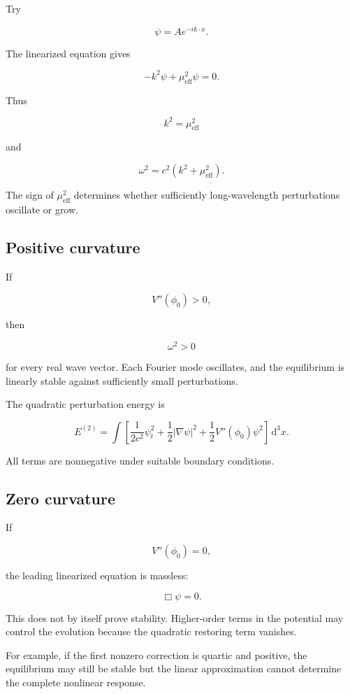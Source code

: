 Try

\[
\psi
=
A e^{-ik\cdot x}.
\]

The linearized equation gives

\[
-k^{2}\psi
+
\mu_{\mathrm{eff}}^{2}\psi
=0.
\]

Thus

\[
\boxed{
k^{2}=\mu_{\mathrm{eff}}^{2}
}
\]

and

\[
\boxed{
\omega^{2}
=
c^{2}
\left(
k^{2}+\mu_{\mathrm{eff}}^{2}
\right)
}.
\]

The sign of \(\mu_{\mathrm{eff}}^{2}\) determines whether sufficiently long-wavelength perturbations oscillate or grow.

\subsection{Positive curvature}

If

\[
V''(\phi_{0})>0,
\]

then

\[
\omega^{2}>0
\]

for every real wave vector. Each Fourier mode oscillates, and the equilibrium is linearly stable against sufficiently small perturbations.

The quadratic perturbation energy is

\[
\boxed{
E^{(2)}
=
\int
\left[
\frac{1}{2c^{2}}\psi_{t}^{2}
+
\frac{1}{2}|\nabla\psi|^{2}
+
\frac{1}{2}
V''(\phi_{0})\psi^{2}
\right]
\,\mathrm{d}^{3}x
}.
\]

All terms are nonnegative under suitable boundary conditions.

\subsection{Zero curvature}

If

\[
V''(\phi_{0})=0,
\]

the leading linearized equation is massless:

\[
\Box\psi=0.
\]

This does not by itself prove stability. Higher-order terms in the potential may control the evolution because the quadratic restoring term vanishes.

For example, if the first nonzero correction is quartic and positive, the equilibrium may still be stable but the linear approximation cannot determine the complete nonlinear response.

